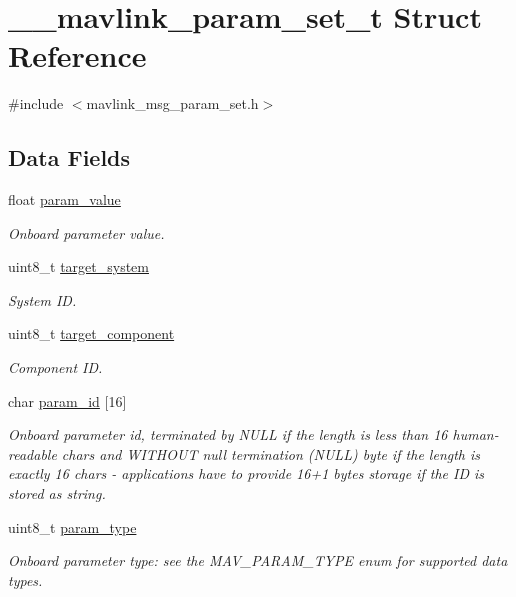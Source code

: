 \hypertarget{struct____mavlink__param__set__t}{\section{\+\_\+\+\_\+mavlink\+\_\+param\+\_\+set\+\_\+t Struct Reference}
\label{struct____mavlink__param__set__t}
}


{\ttfamily \#include $<$mavlink\+\_\+msg\+\_\+param\+\_\+set.\+h$>$}

\subsection*{Data Fields}
\begin{DoxyCompactItemize}
\item 
float \hyperlink{struct____mavlink__param__set__t_a210adccaf668137e5f083c825804276e}{param\+\_\+value}
\begin{DoxyCompactList}\small\item\em Onboard parameter value. \end{DoxyCompactList}\item 
uint8\+\_\+t \hyperlink{struct____mavlink__param__set__t_a501eee1b0a93fa7affad440d51bbab90}{target\+\_\+system}
\begin{DoxyCompactList}\small\item\em System I\+D. \end{DoxyCompactList}\item 
uint8\+\_\+t \hyperlink{struct____mavlink__param__set__t_ad1526f09aefc29226f2362a2a0963237}{target\+\_\+component}
\begin{DoxyCompactList}\small\item\em Component I\+D. \end{DoxyCompactList}\item 
char \hyperlink{struct____mavlink__param__set__t_acfcba135c2e917f0fcf3527bf2354477}{param\+\_\+id} \mbox{[}16\mbox{]}
\begin{DoxyCompactList}\small\item\em Onboard parameter id, terminated by N\+U\+L\+L if the length is less than 16 human-\/readable chars and W\+I\+T\+H\+O\+U\+T null termination (N\+U\+L\+L) byte if the length is exactly 16 chars -\/ applications have to provide 16+1 bytes storage if the I\+D is stored as string. \end{DoxyCompactList}\item 
uint8\+\_\+t \hyperlink{struct____mavlink__param__set__t_a4eb99cce0725481254d653290a06de6f}{param\+\_\+type}
\begin{DoxyCompactList}\small\item\em Onboard parameter type\+: see the M\+A\+V\+\_\+\+P\+A\+R\+A\+M\+\_\+\+T\+Y\+P\+E enum for supported data types. \end{DoxyCompactList}\end{DoxyCompactItemize}



